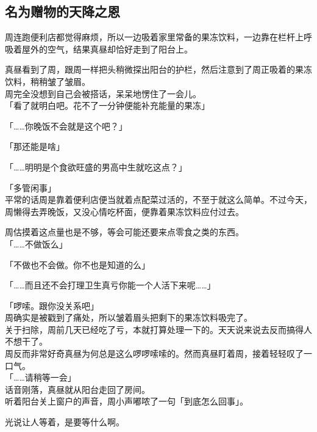 \subsection{名为赠物的天降之恩}

周连跑便利店都觉得麻烦，所以一边吸着家里常备的果冻饮料，一边靠在栏杆上呼吸着屋外的空气，结果真昼却恰好走到了阳台上。

真昼看到了周，跟周一样把头稍微探出阳台的护栏，然后注意到了周正吸着的果冻饮料，稍稍皱了皱眉。\\

周完全没想到自己会被搭话，呆呆地愣住了一会儿。\\

「看了就明白吧。花不了一分钟便能补充能量的果冻」

「……你晚饭不会就是这个吧？」

「那还能是啥」

「……明明是个食欲旺盛的男高中生就吃这点？」

「多管闲事」\\

平常的话周是靠着便利店便当就着点配菜过活的，不至于就这么简单。不过今天，周懒得去弄晚饭，又没心情吃杯面，便靠着果冻饮料应付过去。

周估摸着这点量也是不够，等会可能还要来点零食之类的东西。\\

「……不做饭么」

「不做也不会做。你不也是知道的么」

「……而且还不会打理卫生真亏你能一个人活下来呢……」

「啰嗦。跟你没关系吧」\\

周确实是被戳到了痛处，所以皱着眉头把剩下的果冻饮料吸完了。\\

关于扫除，周前几天已经吃了亏，本就打算处理一下的。天天说来说去反而搞得人不想干了。\\

周反而非常好奇真昼为何总是这么啰啰嗦嗦的。然而真昼盯着周，接着轻轻叹了一口气。\\

「……请稍等一会」\\

话音刚落，真昼就从阳台走回了房间。\\

听着阳台关上窗户的声音，周小声嘟哝了一句「到底怎么回事」。

光说让人等着，是要等什么啊。\\

